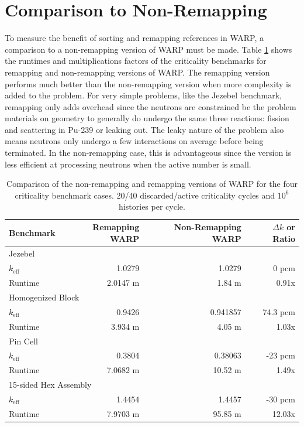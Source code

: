 \section{Comparison to Non-Remapping}

To measure the benefit of sorting and remapping references in WARP, a comparison to a non-remapping version of WARP must be made.  Table \ref{benchmark_nonremapping_summary} shows the runtimes and multiplications factors of the criticality benchmarks for remapping and non-remapping versions of WARP.  The remapping version performs much better than the non-remapping version when more complexity is added to the problem.  For very simple problems, like the Jezebel benchmark, remapping only adds overhead since the neutrons are constrained be the problem materials on geometry to generally do undergo the same three reactions: fission and scattering in Pu-239 or leaking out.  The leaky nature of the problem also means neutrons only undergo a few interactions on average before being terminated.  In the non-remapping case, this is advantageous since the version is less efficient at processing neutrons when the active number is small.

\begin{table}[h]
\centering
\caption{Comparison of the non-remapping and remapping versions of WARP for the four criticality benchmark cases.  20/40 discarded/active criticality cycles and $10^6$ histories per cycle.}
\label{benchmark_nonremapping_summary}
\begin{tabular}{| l | r | r | r |}
 \hline
 Benchmark & Remapping WARP & Non-Remapping WARP & $\Delta k$ or Ratio  \\
\hline
\hline
\multicolumn{4}{|l|}{Jezebel}  \\
\hline
 $k_\mathrm{eff}$ & 1.0279 & 1.0279  & 0 pcm\\
 \hline
 Runtime               &   2.0147 m & 1.84 m & 0.91x \\
 \hline
 \hline
\multicolumn{4}{|l|}{Homogenized Block }\\
\hline
 $k_\mathrm{eff}$ & 0.9426 & 0.941857 & 74.3 pcm  \\
 \hline
 Runtime               &  3.934 m & 4.05 m & 1.03x \\
 \hline
  \hline
\multicolumn{4}{|l|}{Pin Cell}\\
\hline
 $k_\mathrm{eff}$ &  0.3804 & 0.38063  & -23 pcm \\
 \hline
 Runtime               & 7.0682 m & 10.52 m & 1.49x \\
 \hline
  \hline
\multicolumn{4}{|l|}{15-sided Hex Assembly}\\
\hline
 $k_\mathrm{eff}$  & 1.4454  & 1.4457 & -30 pcm \\
 \hline
 Runtime               & 7.9703 m & 95.85 m & 12.03x \\
 \hline
\end{tabular}
\end{table}

